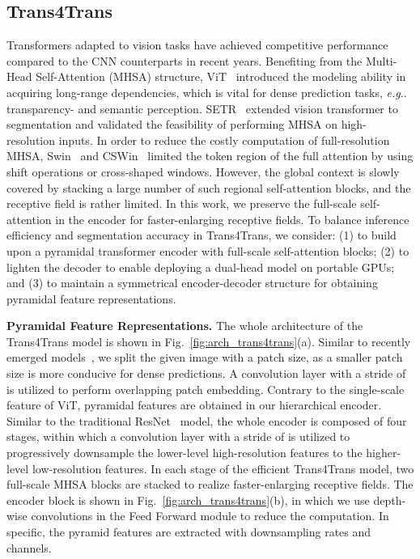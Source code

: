 \documentclass[journal]{IEEEtran}
\makeatletter
\DeclareRobustCommand\onedot{\futurelet\@let@token\@onedot}
\def\@onedot{\ifx\@let@token.\else.\null\fi\xspace}
\def\eg{\emph{e.g}\onedot} \def\Eg{\emph{E.g}\onedot}
\makeatother
\begin{document}
\subsection{Trans4Trans}
Transformers adapted to vision tasks have achieved competitive performance compared to the CNN counterparts in recent years. Benefiting from the Multi-Head Self-Attention (MHSA) structure, ViT~\cite{vit} introduced the modeling ability in acquiring long-range dependencies, which is vital for dense prediction tasks, \eg transparency- and semantic perception. SETR~\cite{setr} extended vision transformer to segmentation and validated the feasibility of performing MHSA on high-resolution inputs. In order to reduce the costly computation of full-resolution MHSA, Swin~\cite{swin} and CSWin~\cite{dong2021cswin} limited the token region of the full attention by using shift operations or cross-shaped windows. However, the global context is slowly covered by stacking a large number of such regional self-attention blocks, and the receptive field is rather limited. In this work, we preserve the full-scale self-attention in the encoder for faster-enlarging receptive fields. To balance inference efficiency and segmentation accuracy in Trans4Trans, we consider: (1) to build upon a pyramidal transformer encoder with full-scale self-attention blocks; (2) to lighten the decoder to enable deploying a dual-head model on portable GPUs; and (3) to maintain a symmetrical encoder-decoder structure for obtaining pyramidal feature representations.

\noindent \textbf{Pyramidal Feature Representations.}
The whole architecture of the Trans4Trans model is shown in Fig.~\ref{fig:arch_trans4trans}(a). 
Similar to recently emerged models~\cite{segformer}\cite{dong2021cswin}, we split the given image  with a  patch size, as a smaller patch size is more conducive for dense predictions. A  convolution layer with a stride of  is utilized to perform overlapping patch embedding. 
Contrary to the single-scale feature of ViT, pyramidal features  are obtained in our hierarchical encoder. 
Similar to the traditional ResNet~\cite{resnet} model, the whole encoder is composed of four stages, within which a  convolution layer with a stride of  is utilized to progressively downsample the lower-level high-resolution features to the higher-level low-resolution features. 
In each stage of the efficient Trans4Trans model, two full-scale MHSA blocks are stacked to realize faster-enlarging receptive fields. The encoder block is shown in Fig.~\ref{fig:arch_trans4trans}(b), in which we use depth-wise convolutions in the Feed Forward module to reduce the computation.
In specific, the pyramid features are extracted with  downsampling rates and  channels.
\end{document}
